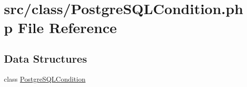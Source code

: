 \hypertarget{_postgre_s_q_l_condition_8php}{}\section{src/class/\+Postgre\+S\+Q\+L\+Condition.php File Reference}
\label{_postgre_s_q_l_condition_8php}
\subsection*{Data Structures}
\begin{DoxyCompactItemize}
\item 
class \hyperlink{class_postgre_s_q_l_condition}{Postgre\+S\+Q\+L\+Condition}
\end{DoxyCompactItemize}
